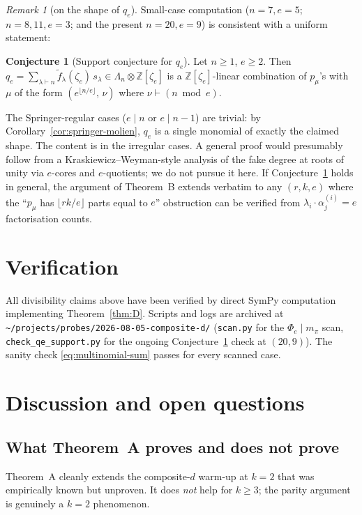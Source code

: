 \documentclass[11pt]{article}
\theoremstyle{plain}
\theoremstyle{definition}
\newtheorem*{conjecture}{Conjecture}
\theoremstyle{remark}
\newtheorem*{remark}{Remark}
\newcommand{\fdeg}{\widetilde{f}}
\newcommand{\ZZ}{\mathbb{Z}}
\begin{document}
\begin{remark}[on the shape of $q_e$]
Small-case computation ($n = 7, e = 5$; $n = 8, 11, e = 3$; and the present $n = 20, e = 9$)
is consistent with a uniform statement:

\begin{conjecture}[Support conjecture for $q_e$]\label{conj:support}
Let $n \ge 1$, $e \ge 2$.  Then $q_e = \sum_{\lambda \vdash n} \fdeg_\lambda(\zeta_e)\, s_\lambda \in \Lambda_n \otimes \ZZ[\zeta_e]$
is a $\ZZ[\zeta_e]$-linear combination of $p_\mu$'s with $\mu$ of the form
$(e^{\lfloor n/e\rfloor},\, \nu)$ where $\nu \vdash (n \bmod e)$.
\end{conjecture}

The Springer-regular cases ($e \mid n$ or $e \mid n - 1$) are trivial:
by Corollary~\ref{cor:springer-molien}, $q_e$ is a single monomial of exactly the claimed shape.
The content is in the irregular cases.  A general proof would presumably follow from a
Kraskiewicz--Weyman-style analysis of the fake degree at roots of unity via $e$-cores and
$e$-quotients; we do not pursue it here.  If Conjecture~\ref{conj:support} holds in general,
the argument of Theorem~B extends verbatim to any $(r, k, e)$ where the
``$p_\mu$ has $\lfloor rk/e\rfloor$ parts equal to $e$'' obstruction can be verified from
$\lambda_i \cdot \alpha^{(i)}_j = e$ factorisation counts.
\end{remark}

\section{Verification}\label{sec:verification}

All divisibility claims above have been verified by direct SymPy
computation implementing Theorem~\ref{thm:D}.  Scripts and logs are archived at
\texttt{\textasciitilde/projects/probes/2026-08-05-composite-d/}
(\texttt{scan.py} for the $\Phi_e \mid m_\pi$ scan,
\texttt{check\_qe\_support.py} for the ongoing Conjecture~\ref{conj:support}
check at $(20, 9)$).  The sanity check
\eqref{eq:multinomial-sum}
passes for every scanned case.

\section{Discussion and open questions}

\subsection*{What Theorem~A proves and does not prove}
Theorem~A cleanly extends the composite-$d$ warm-up at $k = 2$ that was
empirically known but unproven.  It does \emph{not} help for $k \ge 3$;
the parity argument is genuinely a $k = 2$ phenomenon.
\end{document}
